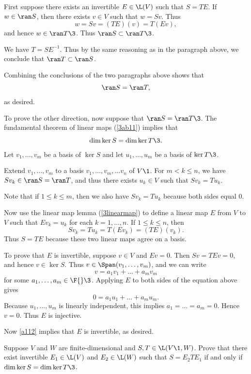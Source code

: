 \begin{Solution}
First suppose there exists an invertible $E \in \L(V)$ such that $S = T E$. If $w \in \ran S$, then there exists $v \in V$ such that $w = Sv$. Thus
\[
w = S v = (TE)(v) = T(Ev),\]
and hence $w \in \ran T\3$. Thus $\ran S \subset \ran T\3$.

We have $T = S E^{-1}$. Thus by the same reasoning as in the paragraph above, we conclude that $\ran T \subset \ran S$.

Combining the conclusions of the two paragraphs above shows that
\[
\ran S = \ran T,
\]
as desired.

To prove the other direction, now suppose that $\ran S = \ran T\3$. The fundamental theorem of linear maps (\ref{3ab11}) implies that
\[
\dim \ker S = \dim \ker T\3.
\]
Let $v_1, \dots, v_m$ be a basis of $\ker S$ and let $u_1, \dots, u_m$ be a basis of $\ker T\3$.

Extend $v_1, \dots, v_m$ to a basis $v_1, \dots, v_m, \dots v_n$ of $V\1$. For $m < k \le n$, we have $S v_k \in \ran S = \ran T$, and thus there exists $u_k \in V$ such that $Sv_k = T u_k$.

Note that if $1 \le k \le m$, then we also have $Sv_k = T u_k$ because both sides equal $0$.

Now use the linear map lemma (\ref{3linearmap}) to define a linear map $E$ from $V$ to $V$ such  that $Ev_k = u_k$ for each $k = 1, \dots, n$. If $1 \le k \le n$, then
\[
S v_k = T u_k = T(Ev_k) = (TE)(v_k).
\]
Thus $S = T E$ because these two linear maps agree on a basis.

\pagebreak[2]

To prove that $E$ is invertible, suppose $v \in V$ and $Ev = 0$. Then $S v = T Ev = 0$, and hence $v \in \ker S$.
Thus $v \in \Span(v_1, \dots, v_m)$, and we can write
\[
v = a_1 v_1 + \dots + a_m v_m
\]
for some $a_1, \dots, a_m \in \F{}\3$. Applying $E$ to both sides of the equation above gives
\[
0 =  a_1 u_1 + \dots + a_m u_m.
\]
Because $u_1, \dots, u_m$ is linearly independent, this implies $a_1 = \dots = a_m = 0$. Hence $v = 0$. Thus $E$ is injective.

Now \ref{a112} implies that $E$ is invertible, as desired.
\end{Solution}

\exercise
Suppose $V$ and $W$ are finite-dimensional and $S, T\in \L(V\1, W)$. Prove that there exist invertible
$E_1 \in \L(V)$ and $E_2\in \L(W)$ such that $S = E_2 T E_1$ if and only if $\dim \ker S = \dim \ker T\3$.

